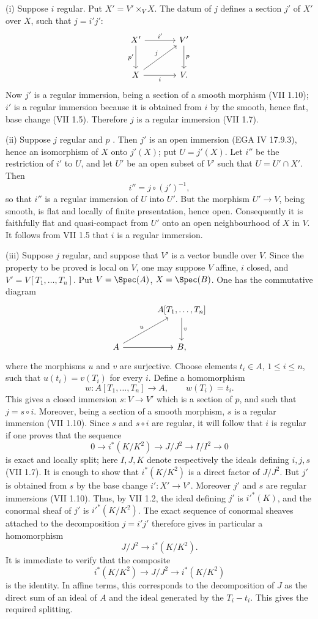 (i) Suppose $i$ regular. Put $X'=V'\times_V X$. The datum of $j$ defines a section $j'$ of $X'$ over $X$, such that $j=i'j'$:
\[
\begin{tikzcd}[column sep=large,row sep=large]
X' \arrow[r,"i'"] \arrow[d,"p'"'] & V' \arrow[d,"p"]\\
X \arrow[r,"i"'] \arrow[ur,"j"] & V .
\end{tikzcd}
\]
Now $j'$ is a regular immersion, being a section of a smooth morphism (VII 1.10); $i'$ is a regular immersion because it is obtained from $i$ by the smooth, hence flat, base change (VII 1.5). Therefore $j$ is a regular immersion (VII 1.7).

(ii) Suppose $j$ regular and $p$ \etale. Then $j'$ is an open immersion (EGA IV 17.9.3), hence an isomorphism of $X$ onto $j'(X)$; put $U=j'(X)$. Let $i''$ be the restriction of $i'$ to $U$, and let $U'$ be an open subset of $V'$ such that $U=U'\cap X'$. Then
\[
i''=j\circ(j')^{-1},
\]
so that $i''$ is a regular immersion of $U$ into $U'$. But the morphism $U'\to V$, being smooth, is flat and locally of finite presentation, hence open. Consequently it is faithfully flat and quasi-compact from $U'$ onto an open neighbourhood of $X$ in $V$. It follows from VII 1.5 that $i$ is a regular immersion.

(iii) Suppose $j$ regular, and suppose that $V'$ is a vector bundle over $V$. Since the property to be proved is local on $V$, one may suppose $V$ affine, $i$ closed, and $V'=V[T_1,\ldots,T_n]$. Put $V=\Spec(A)$, $X=\Spec(B)$. One has the commutative diagram
\[
\begin{tikzcd}[column sep=large,row sep=large]
& A[T_1,\ldots,T_n] \arrow[d,"v"]\\
A \arrow[r] \arrow[ur,"u"] & B,
\end{tikzcd}
\]
where the morphisms $u$ and $v$ are surjective. Choose elements $t_i\in A$, $1\leq i\leq n$, such that $u(t_i)=v(T_i)$ for every $i$. Define a homomorphism
\[
w:A[T_1,\ldots,T_n]\longrightarrow A,
\qquad w(T_i)=t_i.
\]
This gives a closed immersion $s:V\to V'$ which is a section of $p$, and such that $j=s\circ i$. Moreover, being a section of a smooth morphism, $s$ is a regular immersion (VII 1.10). Since $s$ and $s\circ i$ are regular, it will follow that $i$ is regular if one proves that the sequence
\[
0\longrightarrow i^*(K/K^2)\longrightarrow J/J^2\longrightarrow I/I^2\longrightarrow 0
\]
is exact and locally split; here $I,J,K$ denote respectively the ideals defining $i,j,s$ (VII 1.7). It is enough to show that $i^*(K/K^2)$ is a direct factor of $J/J^2$. But $j'$ is obtained from $s$ by the base change $i':X'\to V'$. Moreover $j'$ and $s$ are regular immersions (VII 1.10). Thus, by VII 1.2, the ideal defining $j'$ is $i'^*(K)$, and the conormal sheaf of $j'$ is $i'^*(K/K^2)$. The exact sequence of conormal sheaves attached to the decomposition $j=i'j'$ therefore gives in particular a homomorphism
\[
J/J^2\longrightarrow i^*(K/K^2).
\]
It is immediate to verify that the composite
\[
i^*(K/K^2)\longrightarrow J/J^2\longrightarrow i^*(K/K^2)
\]
is the identity. In affine terms, this corresponds to the decomposition of $J$ as the direct sum of an ideal of $A$ and the ideal generated by the $T_i-t_i$. This gives the required splitting.

